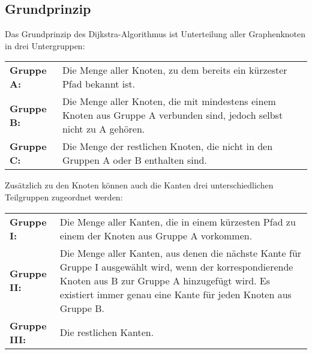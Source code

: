 	\subsection{Grundprinzip}
		\label{Dijkstra_Alg}
		Das Grundprinzip des Dijkstra-Algorithmus ist Unterteilung aller Graphenknoten in drei Untergruppen\cite{DijkstraAlg}:
		
		\begin{tabular}{p{2.5cm} p{10cm}}	
			\textbf{Gruppe A:} & Die Menge aller Knoten, zu dem bereits ein kürzester Pfad bekannt ist.\\[0.25cm]
			\textbf{Gruppe B:} & Die Menge aller Knoten, die mit mindestens einem Knoten aus Gruppe A verbunden sind, jedoch selbst nicht zu A gehören.\\[0.25cm]
			\textbf{Gruppe C:} & Die Menge der restlichen Knoten, die nicht in den Gruppen A oder B enthalten sind.\\[0.25cm]
		\end{tabular}
		
		Zusätzlich zu den Knoten können auch die Kanten drei unterschiedlichen Teilgruppen zugeordnet werden\cite{DijkstraAlg}:
		
		\begin{tabular}{p{2.5cm} p{10cm}}
			\textbf{Gruppe I:} & Die Menge aller Kanten, die in einem kürzesten Pfad zu einem der Knoten aus Gruppe A vorkommen.\\[0.25cm]
			\textbf{Gruppe II:} & Die Menge aller Kanten, aus denen die nächste Kante für Gruppe I ausgewählt wird, wenn der korrespondierende Knoten aus B zur Gruppe A hinzugefügt wird. Es existiert immer genau eine Kante für jeden Knoten aus Gruppe B. \\[0.25cm]
			\textbf{Gruppe III:} & Die restlichen Kanten.\\[0.25cm]
		\end{tabular}
		
